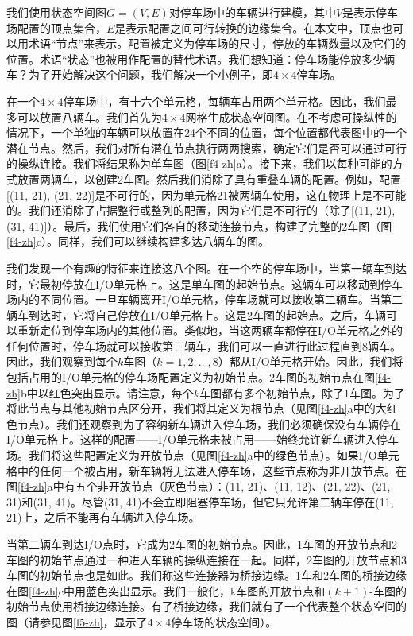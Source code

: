 我们使用状态空间图$G = (V, E)$对停车场中的车辆进行建模，其中$V$是表示停车场配置的顶点集合，$E$是表示配置之间可行转换的边缘集合。在本文中，顶点也可以用术语“节点”来表示。配置被定义为停车场的尺寸，停放的车辆数量以及它们的位置。术语“状态”也被用作配置的替代术语。我们想知道：停车场能停放多少辆车？为了开始解决这个问题，我们解决一个小例子，即$4 \times 4$停车场。

在一个$4 \times 4$停车场中，有十六个单元格，每辆车占用两个单元格。因此，我们最多可以放置八辆车。我们首先为$4 \times 4$网格生成状态空间图。在不考虑可操纵性的情况下，一个单独的车辆可以放置在24个不同的位置，每个位置都代表图中的一个潜在节点。然后，我们对所有潜在节点执行两两搜索，确定它们是否可以通过可行的操纵连接。我们将结果称为单车图（图\ref{f4-zh}a）。接下来，我们以每种可能的方式放置两辆车，以创建2车图。然后我们消除了具有重叠车辆的配置。例如，配置[(11, 21), (21, 22)]是不可行的，因为单元格21被两辆车使用，这在物理上是不可能的。我们还消除了占据整行或整列的配置，因为它们是不可行的（除了[(11, 21), (31, 41)]）。最后，我们使用它们各自的移动连接节点，构建了完整的2车图（图\ref{f4-zh}c）。同样，我们可以继续构建多达八辆车的图。

我们发现一个有趣的特征来连接这八个图。在一个空的停车场中，当第一辆车到达时，它最初停放在I/O单元格上。这是单车图的起始节点。这辆车可以移动到停车场内的不同位置。一旦车辆离开I/O单元格，停车场就可以接收第二辆车。当第二辆车到达时，它将自己停放在I/O单元格上。这是2车图的起始点。之后，车辆可以重新定位到停车场内的其他位置。类似地，当这两辆车都停在I/O单元格之外的任何位置时，停车场就可以接收第三辆车，我们可以一直进行此过程直到8辆车。因此，我们观察到每个$k$车图（$k = 1, 2, \dots, 8$）都从I/O单元格开始。因此，我们将包括占用的I/O单元格的停车场配置定义为初始节点。2车图的初始节点在图\ref{f4-zh}b中以红色突出显示。请注意，每个$k$车图都有多个初始节点，除了1车图。为了将此节点与其他初始节点区分开，我们将其定义为根节点（见图\ref{f4-zh}a中的大红色节点）。我们还观察到为了容纳新车辆进入停车场，我们必须确保没有车辆停在I/O单元格上。这样的配置——I/O单元格未被占用——始终允许新车辆进入停车场。我们将这些配置定义为开放节点（见图\ref{f4-zh}a中的绿色节点）。如果I/O单元格中的任何一个被占用，新车辆将无法进入停车场，这些节点称为非开放节点。在图\ref{f4-zh}a中有五个非开放节点（灰色节点）：(11, 21)、(11, 12)、(21, 22)、(21, 31)和(31, 41)。尽管(31, 41)不会立即阻塞停车场，但它只允许第二辆车停在(11, 21)上，之后不能再有车辆进入停车场。


当第二辆车到达I/O点时，它成为2车图的初始节点。因此，1车图的开放节点和2车图的初始节点通过一种进入车辆的操纵连接在一起。同样，2车图的开放节点和3车图的初始节点也是如此。我们称这些连接器为桥接边缘。1车和2车图的桥接边缘在图\ref{f4-zh}c中用蓝色突出显示。我们一般化，k车图的开放节点和$(k + 1)$-车图的初始节点使用桥接边缘连接。有了桥接边缘，我们就有了一个代表整个状态空间的图（请参见图\ref{f5-zh}，显示了$4 \times 4$停车场的状态空间）。

